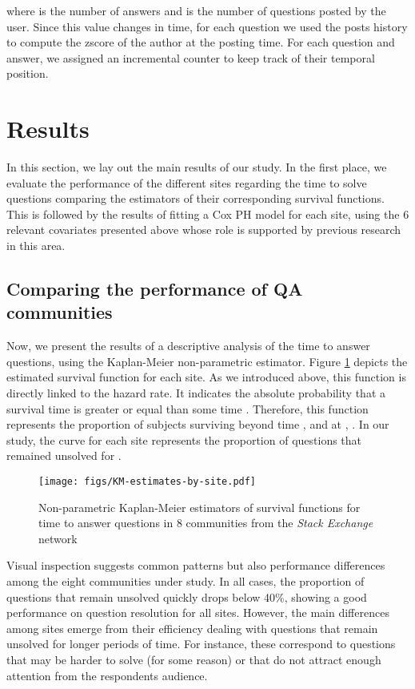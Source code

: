 \documentclass{chi2012}
\begin{document}
where  is the number of answers and  is the number of questions posted by the user.
Since this value changes in time, for each question we used the posts history to compute 
the zscore of the author at the posting time. For each question and answer, we assigned 
an incremental counter to keep track of their temporal position.\\

\section{Results}

In this section, we lay out the main results of our study. In the first place, we evaluate
the performance of the different sites regarding the time to solve questions comparing the
estimators of their corresponding survival functions. This is followed by the results 
of fitting a Cox PH model for each site, using the 6 relevant covariates presented 
above whose role is supported by previous research in this area.

\subsection{Comparing the performance of QA communities}

Now, we present the results of a descriptive analysis of the time to answer questions, 
using the Kaplan-Meier non-parametric estimator. Figure \ref{fig:km-all-sites} 
depicts the estimated survival function  for each site. As we
introduced above, this function is directly linked to the hazard rate. It indicates the
absolute probability that a survival time  is greater or equal than some time 
\cite{mills2011}. Therefore, this function represents the proportion of subjects surviving
beyond time , and at , . In our study, the curve for each site represents
the proportion of questions that remained unsolved for .

\begin{figure}[!h]
\centering
\texttt{[image: figs/KM-estimates-by-site.pdf]}
\caption{Non-parametric Kaplan-Meier estimators of survival functions for time to answer questions in 8 communities from the \textit{Stack Exchange} network}
\label{fig:km-all-sites}
\end{figure}

Visual inspection suggests common patterns but also performance differences among the eight communities under study. In all cases, the proportion of questions that remain unsolved
quickly drops below 40\%, showing a good performance on question resolution for all
sites. However, the main differences among sites emerge from their efficiency dealing with
questions that remain unsolved for longer periods of time. For instance, these 
correspond to questions that may be harder to solve (for some reason) or that do not 
attract enough attention from the respondents audience. 
\end{document}
